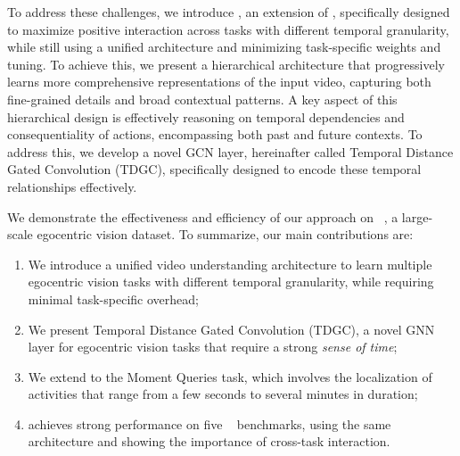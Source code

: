 To address these challenges, we introduce \ours, an extension of \ourscvpr\cite{egopack}, specifically designed to maximize positive interaction across tasks with different temporal granularity, while still using a unified architecture and minimizing task-specific weights and tuning.
To achieve this, we present a hierarchical architecture that progressively learns more comprehensive representations of the input video, capturing both fine-grained details and broad contextual patterns.
A key aspect of this hierarchical design is effectively reasoning on temporal dependencies and consequentiality of actions, encompassing both past and future contexts.
To address this, we develop a novel GCN layer, hereinafter called Temporal Distance Gated Convolution (TDGC), specifically designed to encode these temporal relationships effectively.

We demonstrate the effectiveness and efficiency of our approach on \egofourd~\cite{ego4d}, a large-scale egocentric vision dataset.
To summarize, our main contributions are:
\begin{enumerate}
    \item We introduce a unified video understanding architecture to learn multiple egocentric vision tasks with different temporal granularity, while requiring minimal task-specific overhead;
    \item We present Temporal Distance Gated Convolution (TDGC), a novel GNN layer for egocentric vision tasks that require a strong \textit{sense of time};
    \item We extend \ourscvpr to the Moment Queries task, which involves the localization of activities that range from a few seconds to several minutes in duration;
    \item \ours achieves strong performance on five \egofourd~\cite{ego4d} benchmarks, using the same architecture and showing the importance of cross-task interaction.
\end{enumerate}
